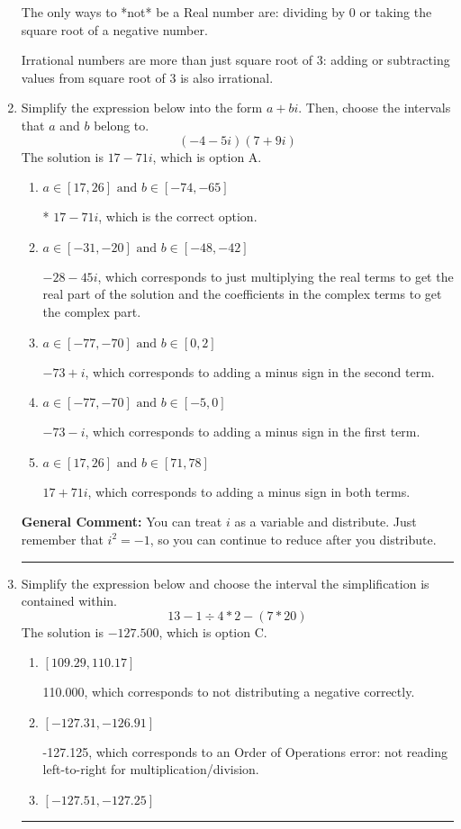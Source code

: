 \documentclass{extbook}[14pt]
\newcommand{\litem}[1]{\item #1

\rule{\textwidth}{0.4pt}}
\begin{document}
\begin{enumerate}
{ The only ways to *not* be a Real number are: dividing by 0 or taking the square root of a negative number. 
 
 Irrational numbers are more than just square root of 3: adding or subtracting values from square root of 3 is also irrational.
}
\litem{
Simplify the expression below into the form $a+bi$. Then, choose the intervals that $a$ and $b$ belong to.
\[ (-4 - 5 i)(7 + 9 i) \]The solution is \( 17 - 71 i \), which is option A.\begin{enumerate}[label=\Alph*.]
\item \( a \in [17, 26] \text{ and } b \in [-74, -65] \)

* $17 - 71 i$, which is the correct option.
\item \( a \in [-31, -20] \text{ and } b \in [-48, -42] \)

 $-28 - 45 i$, which corresponds to just multiplying the real terms to get the real part of the solution and the coefficients in the complex terms to get the complex part.
\item \( a \in [-77, -70] \text{ and } b \in [0, 2] \)

 $-73 + i$, which corresponds to adding a minus sign in the second term.
\item \( a \in [-77, -70] \text{ and } b \in [-5, 0] \)

 $-73 - i$, which corresponds to adding a minus sign in the first term.
\item \( a \in [17, 26] \text{ and } b \in [71, 78] \)

 $17 + 71 i$, which corresponds to adding a minus sign in both terms.
\end{enumerate}

\textbf{General Comment:} You can treat $i$ as a variable and distribute. Just remember that $i^2=-1$, so you can continue to reduce after you distribute.
}
\litem{
Simplify the expression below and choose the interval the simplification is contained within.
\[ 13 - 1 \div 4 * 2 - (7 * 20) \]The solution is \( -127.500 \), which is option C.\begin{enumerate}[label=\Alph*.]
\item \( [109.29, 110.17] \)

 110.000, which corresponds to not distributing a negative correctly.
\item \( [-127.31, -126.91] \)

 -127.125, which corresponds to an Order of Operations error: not reading left-to-right for multiplication/division.
\item \( [-127.51, -127.25] \)


\end{enumerate}}
\end{enumerate}
\end{document}
